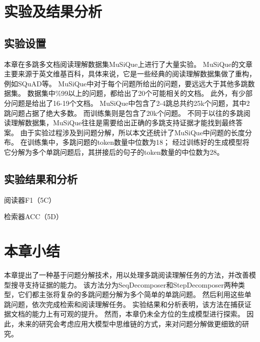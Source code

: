 % 


\section{实验及结果分析}

\subsection{实验设置}
本章在多跳多文档阅读理解数据集MuSiQue上进行了大量实验。
MuSiQue的文章主要来源于英文维基百科，具体来说，它是一些经典的阅读理解数据集做了重构，例如SQuAD等。
MuSiQue中对于每个问题所给出的问题，要远远大于其他多跳数据集。
数据集中\%99以上的问题，都给出了20个可能相关的文档。
此外，有少部分问题是给出了16-19个文档。
MuSiQue中包含了2-4跳总共约25k个问题，其中2跳问题占据了绝大多数。
而训练集则是包含了20k个问题。
不同于以往的多跳阅读理解数据集，MuSiQue往往是需要给出正确的多跳支持证据才能找到最终答案。
由于实验过程涉及到问题分解，所以本文还统计了MuSiQue中问题的长度分布。
在训练集中，多跳问题的token数量中位数为18；
经过训练好的生成模型将它分解为多个单跳问题后，其拼接后的句子的token数量的中位数为28。



\subsection{实验结果和分析}


阅读器F1（5C）

检索器ACC（5D）


\section{本章小结}

本章提出了一种基于问题分解技术，用以处理多跳阅读理解任务的方法，并改善模型搜寻支持证据的能力。
该方法分为SeqDecomposer和StepDecomposer两种类型，它们都主张将复杂的多跳问题分解为多个简单的单跳问题。
然后利用这些单跳问题，依次完成检索和阅读理解任务。
实验结果和分析表明，该方法在捕获证据文档的能力上有可观的提升。
然而，本章仍未全方位的生成模型进行探索。
因此，未来的研究会考虑应用大模型中思维链的方式，来对问题分解做更细致的研究。


